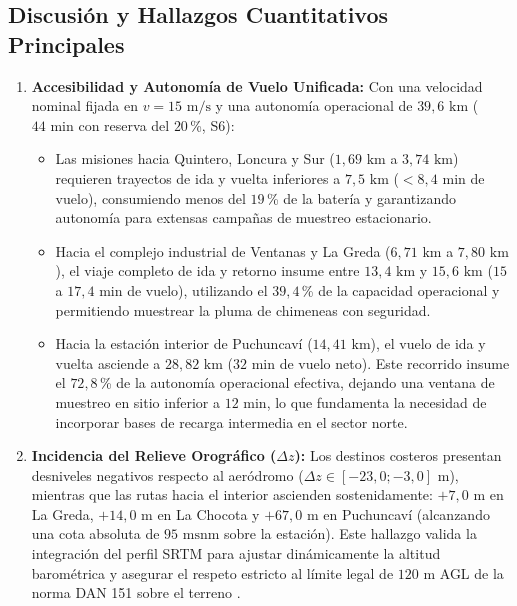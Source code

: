 \documentclass[letterpaper,12pt]{article}
\begin{document}
\subsection{Discusión y Hallazgos Cuantitativos Principales}
\label{subsec:discusion_resultados}

\begin{enumerate}
    \item \textbf{Accesibilidad y Autonomía de Vuelo Unificada:} Con una velocidad nominal fijada en $v = 15\text{ m/s}$ y una autonomía operacional de $39{,}6\text{ km}$ ($44\text{ min}$ con reserva del $20$\,\%, S6):
    \begin{itemize}
        \item Las misiones hacia Quintero, Loncura y Sur ($1{,}69\text{ km}$ a $3{,}74\text{ km}$) requieren trayectos de ida y vuelta inferiores a $7{,}5\text{ km}$ ($<8{,}4\text{ min}$ de vuelo), consumiendo menos del $19$\,\% de la batería y garantizando autonomía para extensas campañas de muestreo estacionario.
        \item Hacia el complejo industrial de Ventanas y La Greda ($6{,}71\text{ km}$ a $7{,}80\text{ km}$), el viaje completo de ida y retorno insume entre $13{,}4\text{ km}$ y $15{,}6\text{ km}$ ($15$ a $17{,}4\text{ min}$ de vuelo), utilizando el $39{,}4$\,\% de la capacidad operacional y permitiendo muestrear la pluma de chimeneas con seguridad.
        \item Hacia la estación interior de Puchuncaví ($14{,}41\text{ km}$), el vuelo de ida y vuelta asciende a $28{,}82\text{ km}$ ($32\text{ min}$ de vuelo neto). Este recorrido insume el $72{,}8$\,\% de la autonomía operacional efectiva, dejando una ventana de muestreo en sitio inferior a $12\text{ min}$, lo que fundamenta la necesidad de incorporar bases de recarga intermedia en el sector norte.
    \end{itemize}
    \item \textbf{Incidencia del Relieve Orográfico ($\Delta z$):} Los destinos costeros presentan desniveles negativos respecto al aeródromo ($\Delta z \in [-23{,}0; -3{,}0]\text{ m}$), mientras que las rutas hacia el interior ascienden sostenidamente: $+7{,}0\text{ m}$ en La Greda, $+14{,}0\text{ m}$ en La Chocota y $+67{,}0\text{ m}$ en Puchuncaví (alcanzando una cota absoluta de $95\text{ msnm}$ sobre la estación). Este hallazgo valida la integración del perfil SRTM para ajustar dinámicamente la altitud barométrica y asegurar el respeto estricto al límite legal de $120\text{ m}$ AGL de la norma DAN 151 sobre el terreno \cite{dan151}.

\end{enumerate}
\end{document}
